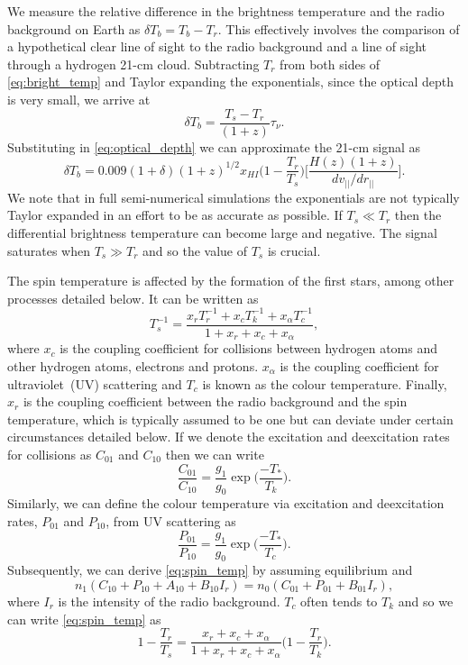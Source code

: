 We measure the relative difference in the brightness temperature and the radio background on Earth as $\delta T_b = T_b - T_r$. This effectively involves the comparison of a hypothetical clear line of sight to the radio background and a line of sight through a hydrogen 21-cm cloud. Subtracting $T_r$ from both sides of \cref{eq:bright_temp} and Taylor expanding the exponentials, since the optical depth is very small, we arrive at
\begin{equation}
    \delta T_b = \frac{T_s - T_r}{(1 + z)} \tau_{\nu}.
\end{equation}
Substituting in \cref{eq:optical_depth} we can approximate the 21-cm signal as
\begin{equation}
    \delta T_b = 0.009 (1 + \delta) (1 + z)^{1/2} x_{HI} \bigg(1 - \frac{T_r}{T_s}\bigg)\bigg[\frac{H(z) (1+z)}{dv_{||}/dr_{||}}\bigg].
\end{equation}
We note that in full semi-numerical simulations the exponentials are not typically Taylor expanded in an effort to be as accurate as possible. If $T_s \ll T_r$ then the differential brightness temperature can become large and negative. The signal saturates when $T_s \gg T_r$ and so the value of $T_s$ is crucial.

The spin temperature is affected by the formation of the first stars, among other processes detailed below. It can be written as
\begin{equation}
    T_s^{-1} = \frac{x_r T_{r}^{-1} +x_c T_k^{-1} + x_\alpha T_c^{-1}}{1 + x_r + x_c + x_\alpha},
    \label{eq:spin_temp}
\end{equation}
where $x_c$ is the coupling coefficient for collisions between hydrogen atoms and other hydrogen atoms, electrons and protons. $x_\alpha$ is the coupling coefficient for ultraviolet~(UV) scattering and $T_c$ is known as the colour temperature. Finally, $x_r$ is the coupling coefficient between the radio background and the spin temperature, which is typically assumed to be one but can deviate under certain circumstances detailed below. If we denote the excitation and deexcitation rates for collisions as $C_{01}$ and $C_{10}$ then we can write
\begin{equation}
    \frac{C_{01}}{C_{10}} = \frac{g_1}{g_0}\exp\bigg(\frac{-T_*}{T_k}\bigg).
\end{equation}
Similarly, we can define the colour temperature via excitation and deexcitation rates, $P_{01}$ and $P_{10}$, from UV scattering as
\begin{equation}
    \frac{P_{01}}{P_{10}} = \frac{g_1}{g_0}\exp\bigg(\frac{-T_*}{T_c}\bigg).
\end{equation}
Subsequently, we can derive \cref{eq:spin_temp} by assuming equilibrium and
\begin{equation}
    n_1(C_{10} +P_{10} + A_{10} + B_{10} I_r) = n_0(C_{01} + P_{01} + B_{01} I_r),
\end{equation}
where $I_r$ is the intensity of the radio background. $T_c$ often tends to $T_k$ and so we can write \cref{eq:spin_temp} as
\begin{equation}
  1 - \frac{T_r}{T_s} = \frac{x_r + x_c + x_\alpha}{1 + x_r + x_c + x_\alpha}\bigg(1 - \frac{T_r}{T_k}\bigg).
\end{equation}

